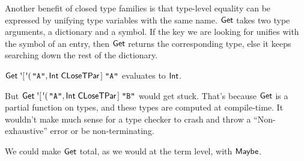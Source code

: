 \resethooks

Another benefit of closed type families is that type-level equality can be
expressed by unifying type variables with the same name.
\ensuremath{\Conid{Get}} takes two type arguments, a dictionary and a symbol.
If the key we are looking for unifies with the symbol of an entry, then
 \ensuremath{\Conid{Get}} returns the corresponding type, else it keeps
 searching down the rest of the dictionary.

\ensuremath{\Conid{Get}\;\mbox{\textquotesingle}[\!\;\mbox{\textquotesingle}(\!\;\text{\tt \char34 A\char34},\Conid{Int}\;\Conid{CLoseTPar}\;\!]\;\text{\tt \char34 A\char34}} evaluates to
\ensuremath{\Conid{Int}}.

But \ensuremath{\Conid{Get}\;\mbox{\textquotesingle}[\!\;\mbox{\textquotesingle}(\!\;\text{\tt \char34 A\char34},\Conid{Int}\;\Conid{CLoseTPar}\;\!]\;\text{\tt \char34 B\char34}} would get stuck.
That's because \ensuremath{\Conid{Get}} is a partial function on types,
 and these types are computed at compile-time. It wouldn't make
 much sense for a type checker to crash and throw a ``Non-exhaustive'' error or
 be non-terminating.

We could make \ensuremath{\Conid{Get}} total, as we would at the term level,
 with \ensuremath{\Conid{Maybe}}.

